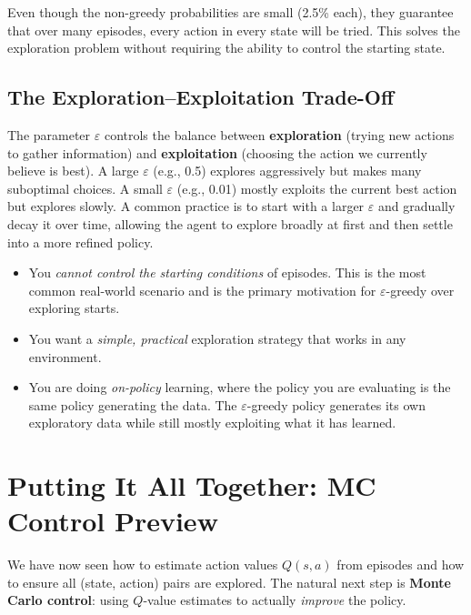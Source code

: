 \documentclass[journal, onecolumn]{IEEEtran}
\newcommand{\vocab}[1]{\textbf{\textcolor{Garnet}{#1}}}
\begin{document}
Even though the non-greedy probabilities are small (2.5\% each), they guarantee that over many episodes, every action in every state will be tried. This solves the exploration problem without requiring the ability to control the starting state.

\subsection{The Exploration--Exploitation Trade-Off}

The parameter $\varepsilon$ controls the balance between \vocab{exploration} (trying new actions to gather information) and \vocab{exploitation} (choosing the action we currently believe is best). A large $\varepsilon$ (e.g., 0.5) explores aggressively but makes many suboptimal choices. A small $\varepsilon$ (e.g., 0.01) mostly exploits the current best action but explores slowly. A common practice is to start with a larger $\varepsilon$ and gradually decay it over time, allowing the agent to explore broadly at first and then settle into a more refined policy.

\begin{tcolorbox}[examplebox={Choose $\varepsilon$-Greedy When...}]
\begin{itemize}[leftmargin=1.5em, itemsep=2pt]
    \item You \textit{cannot control the starting conditions} of episodes. This is the most common real-world scenario and is the primary motivation for $\varepsilon$-greedy over exploring starts.
    \item You want a \textit{simple, practical} exploration strategy that works in any environment.
    \item You are doing \textit{on-policy} learning, where the policy you are evaluating is the same policy generating the data. The $\varepsilon$-greedy policy generates its own exploratory data while still mostly exploiting what it has learned.
\end{itemize}
\end{tcolorbox}

\section{Putting It All Together: MC Control Preview}

We have now seen how to estimate action values $Q(s,a)$ from episodes and how to ensure all (state, action) pairs are explored. The natural next step is \vocab{Monte Carlo control}: using $Q$-value estimates to actually \textit{improve} the policy.
\end{document}
